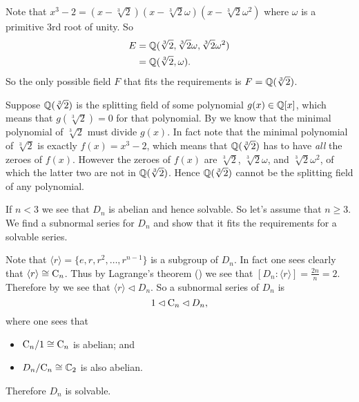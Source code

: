\begin{questions}
    \item \begin{partquestions}{\roman*}
        \item Note that $x^3 - 2 = (x-\sqrt[3]2)(x-\sqrt[3]2\omega)(x-\sqrt[3]2\omega^2)$ where $\omega$ is a primitive 3rd root of unity. So
        \begin{align*}
            E &= \mathbb{Q}(\sqrt[3]2, \sqrt[3]2\omega, \sqrt[3]2\omega^2)\\
            &= \mathbb{Q}(\sqrt[3]2,\omega).
        \end{align*}
        So the only possible field $F$ that fits the requirements is $F = \mathbb{Q}(\sqrt[3]2)$.

        \item Suppose $\mathbb{Q}(\sqrt[3]2)$ is the splitting field of some polynomial $g(x) \in \mathbb{Q}[x]$, which means that $g(\sqrt[3]2) = 0$ for that polynomial. By  we know that the minimal polynomial of $\sqrt[3]2$ must divide $g(x)$. In fact note that the minimal polynomial of $\sqrt[3]2$ is exactly $f(x) = x^3 - 2$, which means that $\mathbb{Q}(\sqrt[3]2)$ has to have \textit{all} the zeroes of $f(x)$. However the zeroes of $f(x)$ are $\sqrt[3]2$, $\sqrt[3]2\omega$, and $\sqrt[3]2\omega^2$, of which the latter two are not in $\mathbb{Q}(\sqrt[3]2)$. Hence $\mathbb{Q}(\sqrt[3]2)$ cannot be the splitting field of any polynomial.
    \end{partquestions}

    \item If $n < 3$ we see that $D_n$ is abelian and hence solvable. So let's assume that $n \geq 3$. We find a subnormal series for $D_n$ and show that it fits the requirements for a solvable series.

    Note that $\langle r \rangle = \{e, r, r^2, \dots, r^{n-1}\}$ is a subgroup of $D_n$. In fact one sees clearly that $\langle r \rangle \cong \mathrm{C}_{n}$. Thus by Lagrange's theorem () we see that $[D_n:\langle r \rangle] = \frac{2n}{n} = 2$. Therefore by  we see that $\langle r \rangle \lhd D_n$. So a subnormal series of $D_n$ is
    \[
        1 \lhd \mathrm{C}_{n} \lhd D_n,
    \]
    where one sees that
    \begin{itemize}
        \item $\mathrm{C}_{n}/1 \cong \mathrm{C}_{n}$ is abelian; and
        \item $D_n/\mathrm{C}_{n} \cong \mathbb{C}_2$ is also abelian.
    \end{itemize}
    Therefore $D_n$ is solvable.


\end{questions}
